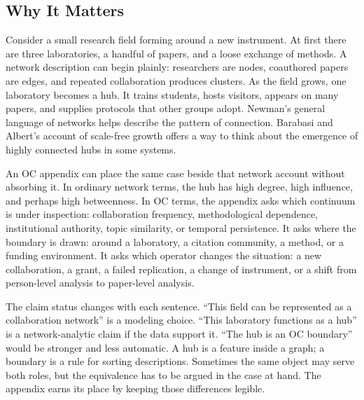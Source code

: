 \documentclass[11pt,a4paper,openany]{book}
\begin{document}
\subsection{Why It Matters}
Consider a small research field forming around a new instrument. At first there are three laboratories, a handful of papers, and a loose exchange of methods. A network description can begin plainly: researchers are nodes, coauthored papers are edges, and repeated collaboration produces clusters. As the field grows, one laboratory becomes a hub. It trains students, hosts visitors, appears on many papers, and supplies protocols that other groups adopt. Newman's general language of networks helps describe the pattern of connection. Barabasi and Albert's account of scale-free growth offers a way to think about the emergence of highly connected hubs in some systems. \cite{raf_networks,bak_soc}\par
An OC appendix can place the same case beside that network account without absorbing it. In ordinary network terms, the hub has high degree, high influence, and perhaps high betweenness. In OC terms, the appendix asks which continuum is under inspection: collaboration frequency, methodological dependence, institutional authority, topic similarity, or temporal persistence. It asks where the boundary is drawn: around a laboratory, a citation community, a method, or a funding environment. It asks which operator changes the situation: a new collaboration, a grant, a failed replication, a change of instrument, or a shift from person-level analysis to paper-level analysis.\par
The claim status changes with each sentence. ``This field can be represented as a collaboration network'' is a modeling choice. ``This laboratory functions as a hub'' is a network-analytic claim if the data support it. ``The hub is an OC boundary'' would be stronger and less automatic. A hub is a feature inside a graph; a boundary is a rule for sorting descriptions. Sometimes the same object may serve both roles, but the equivalence has to be argued in the case at hand. The appendix earns its place by keeping those differences legible.\par
\end{document}
